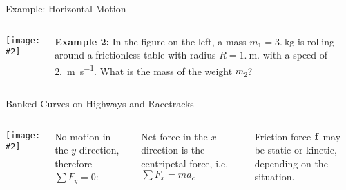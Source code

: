\documentclass[12pt,compress,aspectratio=169]{beamer}
\newcommand{\pic}[2]{\texttt{[image: \#2]}}
\newcommand{\mb}[1]{\ensuremath\mathbf{#1}}
\newcommand{\eq}[2]{\vspace{#1}{\Large\begin{displaymath}#2\end{displaymath}}}
\begin{document}
\begin{frame}{Example: Horizontal Motion}
  \begin{columns}
    \pic{1}{puck-on-table}
    
    \textbf{Example 2:} In the figure on the left, a mass
    $m_1=\SI{3.}{\kilo\gram}$ is rolling around a frictionless table with
    radius $R=\SI{1.}\metre$. with a speed of \SI{2.}{\metre\per\second}.
    What is the mass of the weight $m_2$?
  \end{columns}
\end{frame}



\begin{frame}{Banked Curves on Highways and Racetracks}
  \begin{columns}
    \centering
    \pic{.8}{banked-turn-acceleration}\\

    No motion in the $y$ direction, therefore $\sum F_y=0$:

    \eq{-.25in}{
      N\cos\theta-f\sin\theta-w=0
    }

    Net force in the $x$ direction is the centripetal force, i.e.\
    $\sum F_x=ma_c$

    \eq{-.25in}{
      N\sin\theta +f\cos\theta = \frac{mv^2}r
    }

    Friction force $\mb{f}$ may be static or kinetic, depending on the
    situation.
  \end{columns}
\end{frame}
\end{document}
